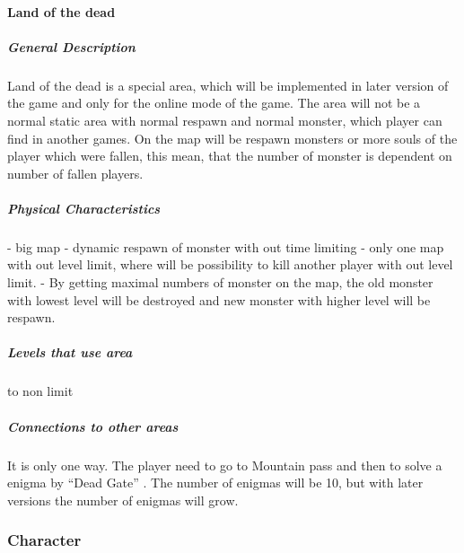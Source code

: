 \documentclass[parskip=full]{scrartcl}
\begin{document}
					\paragraph{Land of the dead}\vspace{-0.5cm}
						\subparagraph{General Description} \vspace{-0.5cm}
							\par \begingroup
							\leftskip=2cm
							\noindent
									Land of the dead is a special area, which will be implemented in later version of the game and only for the online mode of the game. The area will not be a normal static area with normal respawn and normal monster, which player can find in another games. On the map will be respawn monsters or more souls of the player which were fallen, this mean, that the number of monster is dependent on number of fallen players.
							\par \endgroup
						\subparagraph{Physical Characteristics} \vspace{-0.5cm}
							\par \begingroup
							\leftskip=2cm
							\noindent
									- big map
									- dynamic respawn of monster with out time limiting
									- only one map with out level limit, where will be possibility to kill another player with out level limit.
									- By getting maximal numbers  of monster on the map, the old monster with lowest level will be destroyed and new monster with higher level will be respawn.
							\par \endgroup
						\subparagraph{Levels that use area} \vspace{-0.5cm}
							\par \begingroup
							\leftskip=2cm
							 to non limit
							\par \endgroup
						\subparagraph{Connections to other areas} \vspace{-0.5cm}
							\par \begingroup
							\leftskip=2cm
							\noindent
									It is only one way. The player need to go to Mountain pass and then to solve a enigma by “Dead Gate” . The number of enigmas will be 10, but with later versions the number of enigmas will grow.
							\par \endgroup
				\subsubsection{Character}\vspace{-0.5cm}
\end{document}
